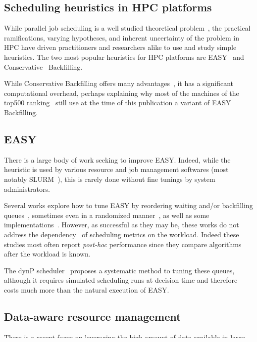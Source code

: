 \documentclass[sigconf]{acmart}
\begin{document}
\subsection{Scheduling heuristics in HPC platforms}

While parallel job scheduling is a well studied theoretical
problem~\cite{leung2004handbook}, the practical ramifications, varying
hypotheses, and inherent uncertainty of the problem in HPC have driven
practitioners and researchers alike to use and study simple heuristics.
The two most popular heuristics for HPC platforms are EASY~\cite{easy} and
Conservative~\cite{Mu'alem:2001:UPW:380314.380315} Backfilling.

While Conservative Backfilling offers many advantages~\cite{bfchar}, it has a
significant computational overhead, perhaps explaining why most of the machines
of the top500 ranking~\cite{top500} still use at the time of this publication a
variant of EASY Backfilling.

\subsection{EASY}
There is a large body of work seeking to improve EASY. Indeed, while the
heuristic is used by various resource and job management softwares (most notably
SLURM~\cite{SLURMdocSCHED}), this is rarely done without fine tunings by system
administrators.

Several works explore how to tune EASY by reordering waiting
and/or backfilling queues~\cite{Tsafrir_easypp_2005}, sometimes even in a
randomized manner~\cite{1592720}, as well as some
implementations~\cite{Jackson2001}. However, as successful as they may be, these works
do not address the dependency~\cite{variability} of scheduling metrics on the
workload. Indeed these studies most often report \textit{post-hoc} performance since
they compare algorithms after the workload is known.

The dynP scheduler~\cite{streit_selftuning_2002} proposes a systematic
method to tuning these queues, although it requires simulated scheduling runs
at decision time and therefore costs much more than the natural execution of EASY.

\subsection{Data-aware resource management}

There is a recent focus on leveraging the high amount of data available in
large scale computing systems in order to improve their behavior. Some works
use collaborative filtering to colocate tasks in clouds by estimating
application interference~\cite{7516031}.  Others are closer to the application
level and use binary classification to distinguish benign memory faults from
application errors in order to execute recovery algorithms (see
~\cite{fmodeling} for instance).
\end{document}
